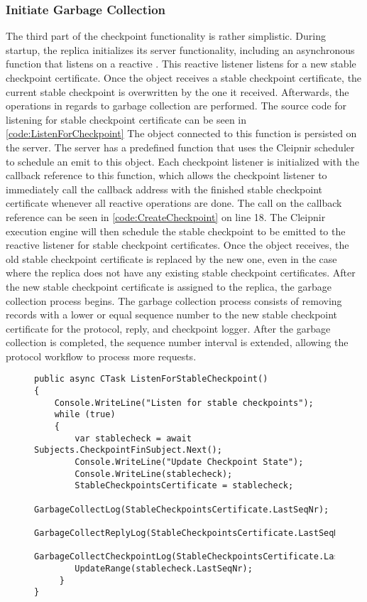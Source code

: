 \subsubsection{Initiate Garbage Collection}
The third part of the checkpoint functionality is rather simplistic. During startup, the replica initializes its server functionality, including an asynchronous function that listens on a reactive . This reactive listener listens for a new stable checkpoint certificate. Once the  object receives a stable checkpoint certificate, the current stable checkpoint is overwritten by the one it received. Afterwards, the operations in regards to garbage collection are performed. The source code for listening for stable checkpoint certificate can be seen in \autoref{code:ListenForCheckpoint}
The  object connected to this function is persisted on the server. The server has a predefined function that uses the Cleipnir scheduler to schedule an emit to this  object. Each checkpoint listener is initialized with the callback reference to this function, which allows the checkpoint listener to immediately call the callback address with the finished stable checkpoint certificate whenever all reactive operations are done. The call on the callback reference can be seen in \autoref{code:CreateCheckpoint} on line 18. The Cleipnir execution engine will then schedule the stable checkpoint to be emitted to the reactive listener for stable checkpoint certificates. Once the  object receives, the old stable checkpoint certificate is replaced by the new one, even in the case where the replica does not have any existing stable checkpoint certificates. After the new stable checkpoint certificate is assigned to the replica, the garbage collection process begins. The garbage collection process consists of removing records with a lower or equal sequence number to the new stable checkpoint certificate for the protocol, reply, and checkpoint logger.
After the garbage collection is completed, the sequence number interval is extended, allowing the protocol workflow to process more requests.

\begin{figure}[H]
	\centering
	\begin{lstlisting}[label = code:ListenForCheckpoint, caption=Reactive handler for new stable checkpoints, captionpos = b, basicstyle=\scriptsize]
public async CTask ListenForStableCheckpoint()
{
    Console.WriteLine("Listen for stable checkpoints");
    while (true)
    {
    	var stablecheck = await Subjects.CheckpointFinSubject.Next();
        Console.WriteLine("Update Checkpoint State");
        Console.WriteLine(stablecheck);
        StableCheckpointsCertificate = stablecheck;
        GarbageCollectLog(StableCheckpointsCertificate.LastSeqNr);
        GarbageCollectReplyLog(StableCheckpointsCertificate.LastSeqNr);
        GarbageCollectCheckpointLog(StableCheckpointsCertificate.LastSeqNr);
        UpdateRange(stablecheck.LastSeqNr);
     }
}
    \end{lstlisting}
\end{figure}

